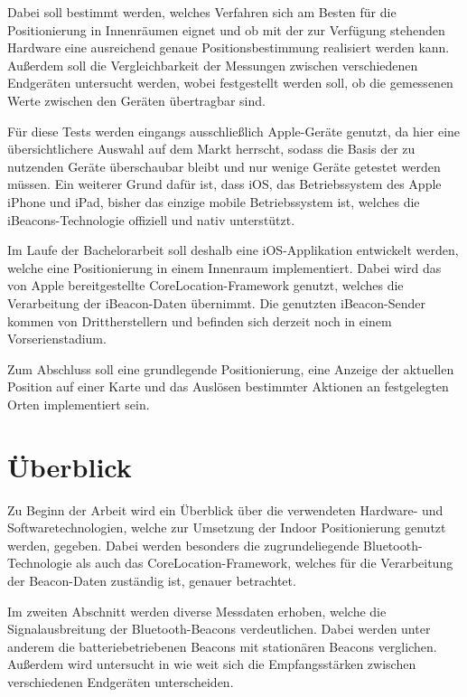 Dabei soll bestimmt werden, welches Verfahren sich am Besten für die Positionierung in Innenräumen eignet und ob mit der zur Verfügung stehenden Hardware eine ausreichend genaue Positionsbestimmung realisiert werden kann. Außerdem soll die Vergleichbarkeit der Messungen zwischen verschiedenen Endgeräten untersucht werden, wobei festgestellt werden soll, ob die gemessenen Werte zwischen den Geräten übertragbar sind.

Für diese Tests werden eingangs ausschließlich Apple-Geräte genutzt, da hier eine übersichtlichere Auswahl auf dem Markt herrscht, sodass die Basis der zu nutzenden Geräte überschaubar bleibt und nur wenige Geräte getestet werden müssen. Ein weiterer Grund dafür ist, dass iOS, das Betriebssystem des Apple iPhone und iPad, bisher das einzige mobile Betriebssystem ist, welches die iBeacons-Technologie offiziell und nativ unterstützt.

Im Laufe der Bachelorarbeit soll deshalb eine iOS-Applikation entwickelt werden, welche eine Positionierung in einem Innenraum implementiert. Dabei wird das von Apple bereitgestellte CoreLocation-Framework genutzt, welches die Verarbeitung der iBeacon-Daten übernimmt. Die genutzten iBeacon-Sender kommen von Drittherstellern und befinden sich derzeit noch in einem Vorserienstadium. 

Zum Abschluss soll eine grundlegende Positionierung, eine Anzeige der aktuellen Position auf einer Karte und das Auslösen bestimmter Aktionen an festgelegten Orten implementiert sein.


\section{Überblick}
\label{sec:introduction:overview}
Zu Beginn der Arbeit wird ein Überblick über die verwendeten Hardware- und Softwaretechnologien, welche zur Umsetzung der Indoor Positionierung genutzt werden, gegeben. Dabei werden besonders die zugrundeliegende Bluetooth-Technologie als auch das CoreLocation-Framework, welches für die Verarbeitung der Beacon-Daten zuständig ist, genauer betrachtet. 

Im zweiten Abschnitt werden diverse Messdaten erhoben, welche die Signalausbreitung der Bluetooth-Beacons verdeutlichen. Dabei werden unter anderem die batteriebetriebenen Beacons mit stationären Beacons verglichen. Außerdem wird untersucht in wie weit sich die Empfangsstärken zwischen verschiedenen Endgeräten unterscheiden. 

